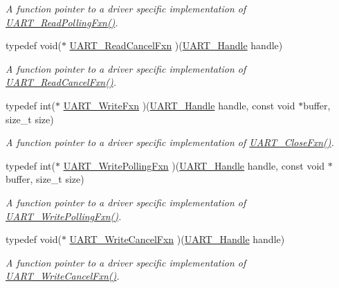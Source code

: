 \begin{DoxyCompactItemize}
\begin{DoxyCompactList}\small\item\em A function pointer to a driver specific implementation of \hyperlink{_u_a_r_t_8h_a0528ac54e13ccc7be4a35e07a09196cb}{U\-A\-R\-T\-\_\-\-Read\-Polling\-Fxn()}. \end{DoxyCompactList}\item 
typedef void($\ast$ \hyperlink{_u_a_r_t_8h_a4a59d01e896c6a223ed56b251ca5b1bf}{U\-A\-R\-T\-\_\-\-Read\-Cancel\-Fxn} )(\hyperlink{_u_a_r_t_8h_a13cc669fae768d8212e6491ce71b28af}{U\-A\-R\-T\-\_\-\-Handle} handle)
\begin{DoxyCompactList}\small\item\em A function pointer to a driver specific implementation of \hyperlink{_u_a_r_t_8h_a4a59d01e896c6a223ed56b251ca5b1bf}{U\-A\-R\-T\-\_\-\-Read\-Cancel\-Fxn()}. \end{DoxyCompactList}\item 
typedef int($\ast$ \hyperlink{_u_a_r_t_8h_afef1aa5e8050d49da2b07530e7f7b7d9}{U\-A\-R\-T\-\_\-\-Write\-Fxn} )(\hyperlink{_u_a_r_t_8h_a13cc669fae768d8212e6491ce71b28af}{U\-A\-R\-T\-\_\-\-Handle} handle, const void $\ast$buffer, size\-\_\-t size)
\begin{DoxyCompactList}\small\item\em A function pointer to a driver specific implementation of \hyperlink{_u_a_r_t_8h_a220a3f8443b9112ee98253078f92eb27}{U\-A\-R\-T\-\_\-\-Close\-Fxn()}. \end{DoxyCompactList}\item 
typedef int($\ast$ \hyperlink{_u_a_r_t_8h_ac7a41a69d6a6f895dcf2276f1ca7bc6c}{U\-A\-R\-T\-\_\-\-Write\-Polling\-Fxn} )(\hyperlink{_u_a_r_t_8h_a13cc669fae768d8212e6491ce71b28af}{U\-A\-R\-T\-\_\-\-Handle} handle, const void $\ast$buffer, size\-\_\-t size)
\begin{DoxyCompactList}\small\item\em A function pointer to a driver specific implementation of \hyperlink{_u_a_r_t_8h_ac7a41a69d6a6f895dcf2276f1ca7bc6c}{U\-A\-R\-T\-\_\-\-Write\-Polling\-Fxn()}. \end{DoxyCompactList}\item 
typedef void($\ast$ \hyperlink{_u_a_r_t_8h_a0fdca649842b40bf9bdbc6e83698eea5}{U\-A\-R\-T\-\_\-\-Write\-Cancel\-Fxn} )(\hyperlink{_u_a_r_t_8h_a13cc669fae768d8212e6491ce71b28af}{U\-A\-R\-T\-\_\-\-Handle} handle)
\begin{DoxyCompactList}\small\item\em A function pointer to a driver specific implementation of \hyperlink{_u_a_r_t_8h_a0fdca649842b40bf9bdbc6e83698eea5}{U\-A\-R\-T\-\_\-\-Write\-Cancel\-Fxn()}. \end{DoxyCompactList}\item 

\end{DoxyCompactItemize}
